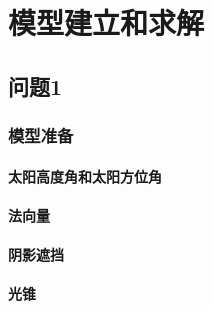 \section{模型建立和求解}
\subsection{问题1}
\subsubsection{模型准备}
\paragraph{太阳高度角和太阳方位角}
\paragraph{法向量}
\paragraph{阴影遮挡}
\paragraph{光锥}

